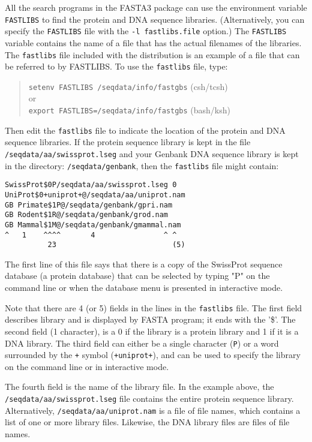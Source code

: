 \documentclass[11pt]{article}
\begin{document}
All the search programs in the FASTA3 package can use the environment
variable \texttt{FASTLIBS} to find the protein and DNA sequence
libraries. (Alternatively, you can specify the \texttt{FASTLIBS} file
with the \texttt{-l fastlibs.file} option.) The \texttt{FASTLIBS}
variable contains the name of a file that has the actual filenames of
the libraries.  The \texttt{fastlibs} file included with the
distribution is an example of a file that can be referred to by
FASTLIBS. To use the \texttt{fastlibs} file, type:
\begin{quote}
\texttt{setenv FASTLIBS /seqdata/info/fastgbs} (csh/tcsh)\\
 or\\
\texttt{export FASTLIBS=/seqdata/info/fastgbs} (bash/ksh)
\end{quote}
 Then edit the \texttt{fastlibs} file to indicate the location of the
 protein and DNA sequence libraries.  If the protein sequence library is
 kept in the file \texttt{/seqdata/aa/swissprot.lseg} and your Genbank
 DNA sequence library is kept in the directory:
 \texttt{/seqdata/genbank}, then the \texttt{fastlibs} file might
 contain:
\begin{verbatim}
SwissProt$0P/seqdata/aa/swissprot.lseg 0
UniProt$0+uniprot+@/seqdata/aa/uniprot.nam
GB Primate$1P@/seqdata/genbank/gpri.nam
GB Rodent$1R@/seqdata/genbank/grod.nam 
GB Mammal$1M@/seqdata/genbank/gmammal.nam
^   1    ^^^^       4                ^ ^
          23                           (5)
\end{verbatim}
The first line of this file says that there is a copy of the SwissProt
sequence database (a protein database) that can be selected by typing
"P" on the command line or when the database menu is presented in
interactive mode.

Note that there are 4 (or 5) fields in the lines in the
\texttt{fastlibs} file.  The first field describes library and is
displayed by FASTA program; it ends with the '\$'.  The second field
(1 character), is a 0 if the library is a protein library and 1 if it
is a DNA library.  The third field can either be a single character
(\texttt{P}) or a word surrounded by the \texttt{+} symbol
(\texttt{+uniprot+}), and can be used to specify the library on the command line or in interactive mode.

The fourth field is the name of the library file.  In the example
above, the \texttt{/seqdata/aa/swissprot.lseg} file contains the
entire protein sequence library.  Alternatively,
\texttt{/seqdata/aa/uniprot.nam} is a file of file names, which
contains a list of one or more library files.  Likewise, the DNA
library files are files of file names.
\end{document}
